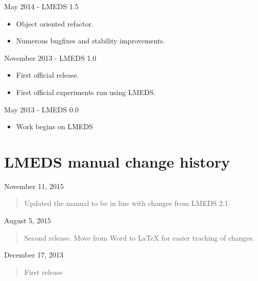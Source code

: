 \documentclass[12pt, oneside]{scrbook}   	%
\begin{document}
May 2014 - LMEDS 1.5

\begin{itemize}
\item Object oriented refactor.
\item Numerous bugfixes and stability improvements.
\end{itemize}

November 2013 - LMEDS 1.0

\begin{itemize}
\item First official release.  
\item First official experiments run using LMEDS.
\end{itemize}

May 2013 - LMEDS 0.0

\begin{itemize}
\item Work begins on LMEDS
\end{itemize}


\section{LMEDS manual change history}

November 11, 2015

\begin{quote}
Updated the manual to be in line with changes from LMEDS 2.1.
\end{quote}

August 5, 2015

\begin{quote}
Second release.  Move from Word to LaTeX for easier tracking of changes.
\end{quote}

December 17, 2013


\begin{quote}
First release
\end{quote}
\end{document}
